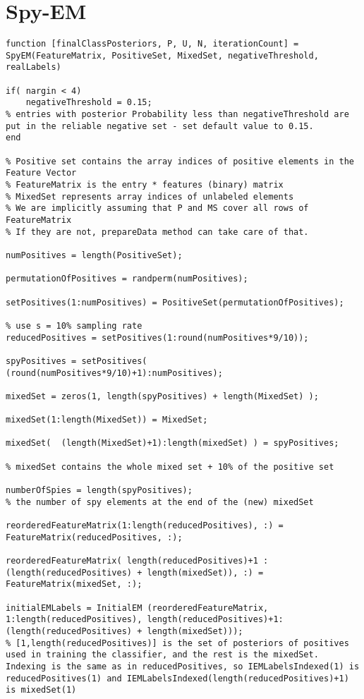 \documentclass[12pt,twoside,notitlepage,amsart]{report} %
\begin{document}
	\section{Spy-EM}
	\begin{lstlisting}
function [finalClassPosteriors, P, U, N, iterationCount] = SpyEM(FeatureMatrix, PositiveSet, MixedSet, negativeThreshold, realLabels)

if( nargin < 4)
    negativeThreshold = 0.15;
% entries with posterior Probability less than negativeThreshold are put in the reliable negative set - set default value to 0.15.
end

% Positive set contains the array indices of positive elements in the Feature Vector
% FeatureMatrix is the entry * features (binary) matrix 
% MixedSet represents array indices of unlabeled elements
% We are implicitly assuming that P and MS cover all rows of FeatureMatrix
% If they are not, prepareData method can take care of that.

numPositives = length(PositiveSet);

permutationOfPositives = randperm(numPositives);

setPositives(1:numPositives) = PositiveSet(permutationOfPositives);

% use s = 10% sampling rate
reducedPositives = setPositives(1:round(numPositives*9/10));

spyPositives = setPositives( (round(numPositives*9/10)+1):numPositives);

mixedSet = zeros(1, length(spyPositives) + length(MixedSet) );

mixedSet(1:length(MixedSet)) = MixedSet;

mixedSet(  (length(MixedSet)+1):length(mixedSet) ) = spyPositives;

% mixedSet contains the whole mixed set + 10% of the positive set

numberOfSpies = length(spyPositives);
% the number of spy elements at the end of the (new) mixedSet

reorderedFeatureMatrix(1:length(reducedPositives), :) = FeatureMatrix(reducedPositives, :);

reorderedFeatureMatrix( length(reducedPositives)+1 : (length(reducedPositives) + length(mixedSet)), :) = FeatureMatrix(mixedSet, :);

initialEMLabels = InitialEM (reorderedFeatureMatrix, 1:length(reducedPositives), length(reducedPositives)+1: (length(reducedPositives) + length(mixedSet)));
% [1,length(reducedPositives)] is the set of posteriors of positives used in training the classifier, and the rest is the mixedSet. Indexing is the same as in reducedPositives, so IEMLabelsIndexed(1) is reducedPositives(1) and IEMLabelsIndexed(length(reducedPositives)+1) is mixedSet(1) 


\end{lstlisting}
\end{document}
